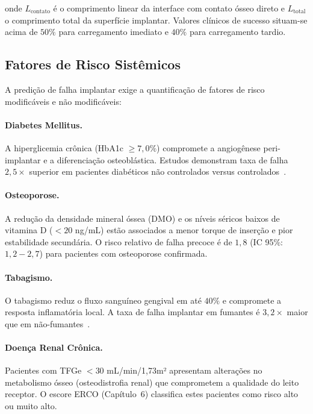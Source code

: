 onde $L_{\text{contato}}$ é o comprimento linear da interface com contato ósseo direto e $L_{\text{total}}$ o comprimento total da superfície implantar. Valores clínicos de sucesso situam-se acima de $50\%$ para carregamento imediato e $40\%$ para carregamento tardio.

\subsection{Fatores de Risco Sistêmicos}
\label{subsec:fatores-risco-sistemicos}

A predição de falha implantar exige a quantificação de fatores de risco modificáveis e não modificáveis:

\paragraph{Diabetes Mellitus.} A hiperglicemia crônica (HbA1c $\geq 7,0\%$) compromete a angiogênese peri-implantar e a diferenciação osteoblástica. Estudos demonstram taxa de falha $2,5\times$ superior em pacientes diabéticos não controlados versus controlados~\cite{chrcanovic2014diabetes}.

\paragraph{Osteoporose.} A redução da densidade mineral óssea (DMO) e os níveis séricos baixos de vitamina D ($<20$ ng/mL) estão associados a menor torque de inserção e pior estabilidade secundária. O risco relativo de falha precoce é de $1,8$ (IC 95\%: $1,2-2,7$) para pacientes com osteoporose confirmada.

\paragraph{Tabagismo.} O tabagismo reduz o fluxo sanguíneo gengival em até $40\%$ e compromete a resposta inflamatória local. A taxa de falha implantar em fumantes é $3,2\times$ maior que em não-fumantes~\cite{chrcanovic2017smoking}.

\paragraph{Doença Renal Crônica.} Pacientes com TFGe $< 30$ mL/min/1,73m² apresentam alterações no metabolismo ósseo (osteodistrofia renal) que comprometem a qualidade do leito receptor. O escore ERCO (Capítulo~6) classifica estes pacientes como risco alto ou muito alto.

